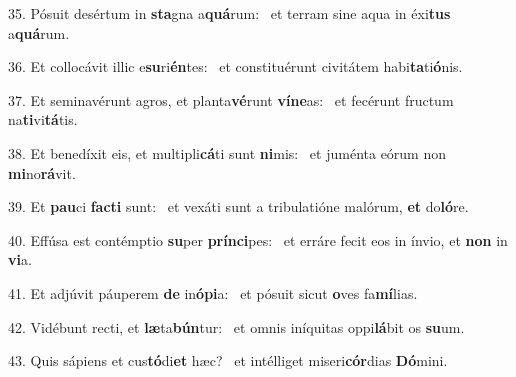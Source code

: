 35. Pósuit desértum in \textbf{sta}gna a\textbf{quá}rum: \ast\  et terram sine aqua in éxi\textbf{tus} a\textbf{quá}rum.\

36. Et collocávit illic e\textbf{su}ri\textbf{én}tes: \ast\  et constituérunt civitátem habi\textbf{ta}ti\textbf{ó}nis.\

37. Et seminavérunt agros, et planta\textbf{vé}runt \textbf{ví}\textbf{ne}as: \ast\  et fecérunt fructum na\textbf{ti}vi\textbf{tá}tis.\

38. Et benedíxit eis, et multipli\textbf{cá}ti sunt \textbf{ni}mis: \ast\  et juménta eórum non \textbf{mi}no\textbf{rá}vit.\

39. Et \textbf{pau}ci \textbf{fac}\textbf{ti} sunt: \ast\  et vexáti sunt a tribulatióne malórum, \textbf{et} do\textbf{ló}re.\

40. Effúsa est contémptio \textbf{su}per \textbf{prín}\textbf{ci}pes: \ast\  et erráre fecit eos in ínvio, et \textbf{non} in \textbf{vi}a.\

41. Et adjúvit páuperem \textbf{de} in\textbf{ó}\textbf{pi}a: \ast\  et pósuit sicut \textbf{o}ves fa\textbf{mí}lias.\

42. Vidébunt recti, et \textbf{læ}ta\textbf{bún}tur: \ast\  et omnis iníquitas oppi\textbf{lá}bit os \textbf{su}um.\

43. Quis sápiens et cus\textbf{tó}di\textbf{et} hæc? \ast\  et intélliget miseri\textbf{cór}dias \textbf{Dó}mini.\

